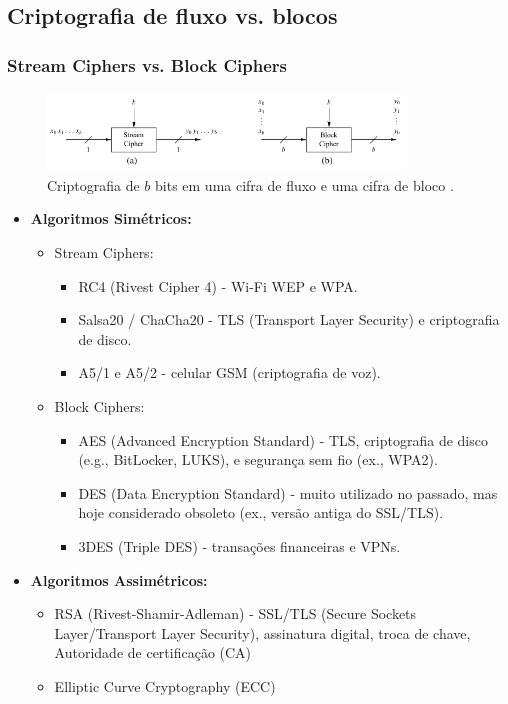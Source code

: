 \subsection{Criptografia de fluxo vs. blocos}
\begin{frame}[allowframebreaks]
\frametitle{Stream Ciphers vs. Block Ciphers}
\begin{figure}[h]
\centering
\includegraphics[width=0.85\textwidth,height=0.5\textheight,keepaspectratio]{figures/stream_block.png}
\caption{Criptografia de $b$ bits em uma cifra de fluxo e uma cifra de bloco \cite{paar2014}.}
\label{fig-stream_block}
\end{figure}

\begin{itemize}
    \item \textbf{Algoritmos Simétricos:}
    \begin{itemize}
    \item Stream Ciphers:
    \begin{itemize}
        \item RC4 (Rivest Cipher 4) - Wi-Fi WEP e WPA.
        \item Salsa20 / ChaCha20 - TLS (Transport Layer Security) e criptografia de disco.
	\item A5/1 e A5/2 - celular GSM (criptografia de voz).
    \end{itemize}
    
    \item Block Ciphers:
    \begin{itemize}
	\item AES (Advanced Encryption Standard) - TLS, criptografia de disco (e.g., BitLocker, LUKS), e segurança sem fio (ex., WPA2).
	\item DES (Data Encryption Standard) - muito utilizado no passado, mas hoje considerado obsoleto (ex., versão antiga do SSL/TLS).
	\item 3DES (Triple DES) - transações financeiras e VPNs.
    \end{itemize}
    \end{itemize}

    \item \textbf{Algoritmos Assimétricos:}
    \begin{itemize}
	\item RSA (Rivest-Shamir-Adleman) - SSL/TLS (Secure Sockets Layer/Transport Layer Security), assinatura digital, troca de chave, Autoridade de certificação (CA)
	\item Elliptic Curve Cryptography (ECC)
    \end{itemize}
\end{itemize}
\end{frame}


